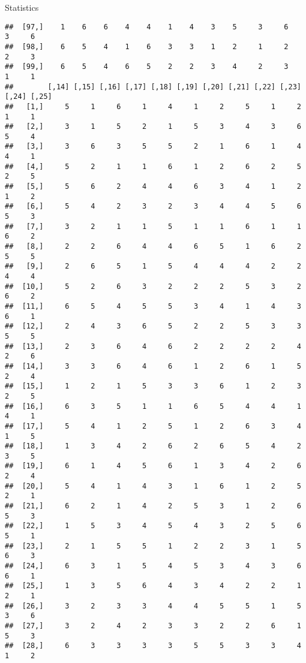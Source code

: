 \documentclass[
  ignorenonframetext,
]{beamer}
\begin{document}
\begin{frame}[fragile]{Statistics}
\begin{verbatim}
##  [97,]    1    6    6    4    4    1    4    3    5     3     6     3     6
##  [98,]    6    5    4    1    6    3    3    1    2     1     2     2     3
##  [99,]    6    5    4    6    5    2    2    3    4     2     3     1     1
##        [,14] [,15] [,16] [,17] [,18] [,19] [,20] [,21] [,22] [,23] [,24] [,25]
##   [1,]     5     1     6     1     4     1     2     5     1     2     1     1
##   [2,]     3     1     5     2     1     5     3     4     3     6     5     4
##   [3,]     3     6     3     5     5     2     1     6     1     4     4     1
##   [4,]     5     2     1     1     6     1     2     6     2     5     2     5
##   [5,]     5     6     2     4     4     6     3     4     1     2     1     2
##   [6,]     5     4     2     3     2     3     4     4     5     6     5     3
##   [7,]     3     2     1     1     5     1     1     6     1     1     6     2
##   [8,]     2     2     6     4     4     6     5     1     6     2     5     5
##   [9,]     2     6     5     1     5     4     4     4     2     2     4     4
##  [10,]     5     2     6     3     2     2     2     5     3     2     6     2
##  [11,]     6     5     4     5     5     3     4     1     4     3     6     1
##  [12,]     2     4     3     6     5     2     2     5     3     3     5     5
##  [13,]     2     3     6     4     6     2     2     2     2     4     2     6
##  [14,]     3     3     6     4     6     1     2     6     1     5     2     4
##  [15,]     1     2     1     5     3     3     6     1     2     3     2     5
##  [16,]     6     3     5     1     1     6     5     4     4     1     4     1
##  [17,]     5     4     1     2     5     1     2     6     3     4     1     5
##  [18,]     1     3     4     2     6     2     6     5     4     2     3     5
##  [19,]     6     1     4     5     6     1     3     4     2     6     2     4
##  [20,]     5     4     1     4     3     1     6     1     2     5     2     1
##  [21,]     6     2     1     4     2     5     3     1     2     6     5     3
##  [22,]     1     5     3     4     5     4     3     2     5     6     5     1
##  [23,]     2     1     5     5     1     2     2     3     1     5     6     3
##  [24,]     6     3     1     5     4     5     3     4     3     6     6     1
##  [25,]     1     3     5     6     4     3     4     2     2     1     2     1
##  [26,]     3     2     3     3     4     4     5     5     1     5     3     6
##  [27,]     3     2     4     2     3     3     2     2     6     1     5     3
##  [28,]     6     3     3     3     3     5     5     3     3     4     1     2

\end{verbatim}
\end{frame}
\end{document}
